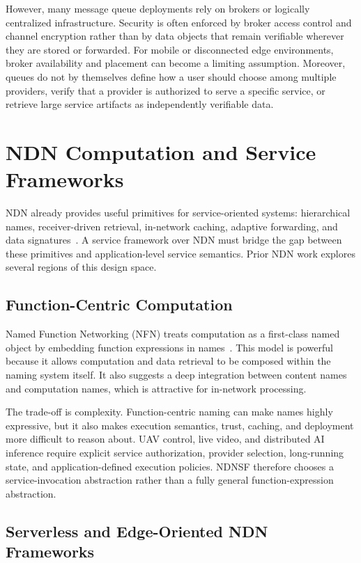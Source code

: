 However, many message queue deployments rely on brokers or logically
centralized infrastructure. Security is often enforced by broker access control
and channel encryption rather than by data objects that remain verifiable
wherever they are stored or forwarded. For mobile or disconnected edge
environments, broker availability and placement can become a limiting
assumption. Moreover, queues do not by themselves define how a user should
choose among multiple providers, verify that a provider is authorized to serve
a specific service, or retrieve large service artifacts as independently
verifiable data.

\section{NDN Computation and Service Frameworks}

NDN already provides useful primitives for service-oriented systems:
hierarchical names, receiver-driven retrieval, in-network caching, adaptive
forwarding, and data signatures~\cite{ndn}. A service framework over NDN must
bridge the gap between these primitives and application-level service
semantics. Prior NDN work explores several regions of this design space.

\subsection{Function-Centric Computation}

Named Function Networking (NFN) treats computation as a first-class named
object by embedding function expressions in names~\cite{nfn}. This model is
powerful because it allows computation and data retrieval to be composed within
the naming system itself. It also suggests a deep integration between content
names and computation names, which is attractive for in-network processing.

The trade-off is complexity. Function-centric naming can make names highly
expressive, but it also makes execution semantics, trust, caching, and
deployment more difficult to reason about. UAV control, live video, and
distributed AI inference require explicit service authorization, provider
selection, long-running state, and application-defined execution policies.
NDNSF therefore chooses a service-invocation abstraction rather than a fully
general function-expression abstraction.

\subsection{Serverless and Edge-Oriented NDN Frameworks}

